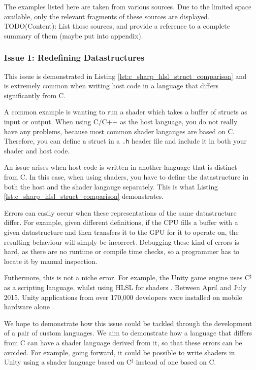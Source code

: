 \documentclass[a4paper,12pt,twoside,openright]{report}
\begin{document}
The examples listed here are taken from various sources. Due to the limited
space available, only the relevant fragments of these sources are displayed.
TODO(Content): List those sources, and provide a reference to a complete summary of
them (maybe put into appendix).

\subsubsection{Issue 1: Redefining Datastructures}

This issue is demonstrated in Listing \ref{lst:c_sharp_hlsl_struct_comparison}
and is extremely common when writing host code in a language that differs
significantly from C.

A common example is wanting to run a shader which takes a buffer of structs as
input or output. When using C/C++ as the host language, you do not really have
any problems, because most common shader langauges are based on C. Therefore,
you can define a struct in a \texttt{.h} header file and include it in both
your shader and host code.

An issue arises when host code is written in another language that is distinct
from C. In this case, when using shaders, you have to define the datastructure
in both the host and the shader langauge separately. This is what Listing
\ref{lst:c_sharp_hlsl_struct_comparison} demonstrates.

Errors can easily occur when these representations of the same datastructure
differ. For example, given different definitions, if the CPU fills a buffer
with a given datastructure and then transfers it to the GPU for it to operate
on, the resulting behaviour will simply be incorrect. Debugging these kind of
errors is hard, as there are no runtime or compile time checks, so a programmer
has to locate it by manual inspection.

Futhermore, this is not a niche error. For example, the Unity game engine uses
C$^\sharp$ as a scripting language, whilst using HLSL for shaders \cite{TODO}.
Between April and July 2015, Unity applications from over 170,000 developers
were installed on mobile hardware alone \cite{UnityByTheNumbers}.

We hope to demonstrate how this issue could be tackled through the development
of a pair of custom languages. We aim to demonstrate how a language that differs
from C can have a shader language derived from it, so that these errors can
be avoided. For example, going forward, it could be possible to write shaders
in Unity using a shader language based on C$^\sharp$ instead of one based on C.
\end{document}
